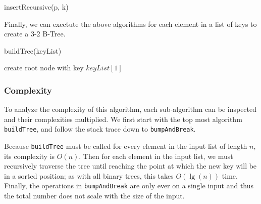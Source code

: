 \documentclass{article}
\begin{document}
            \begin{function}
                \caption{insertRecursive(p, k)}
                \DontPrintSemicolon


            \end{function}
        
    \pagebreak

            Finally, we can exectute the above algorithms for each element in a list of keys to create a 3-2 B-Tree.

            \begin{function}
                \caption{buildTree(keyList)}
                \DontPrintSemicolon


                create root node with key $keyList[1]$\;

            \end{function}

        \subsubsection*{Complexity}

            To analyze the complexity of this algorithm, each sub-algorithm can be inspected and their complexities multiplied.  We first start with the top most algorithm \texttt{buildTree}, and follow the stack trace down to \texttt{bumpAndBreak}.

            Because \texttt{buildTree} must be called for every element in the input list of length $n$, its complexity is $O(n)$.  Then for each element in the input list, we must recursively traverse the tree until reaching the point at which the new key will be in a sorted position; as with all binary trees, this takes $O(\lg(n))$ time.  Finally, the operations in \texttt{bumpAndBreak} are only ever on a single input and thus the total number does not scale with the size of the input.
\end{document}
